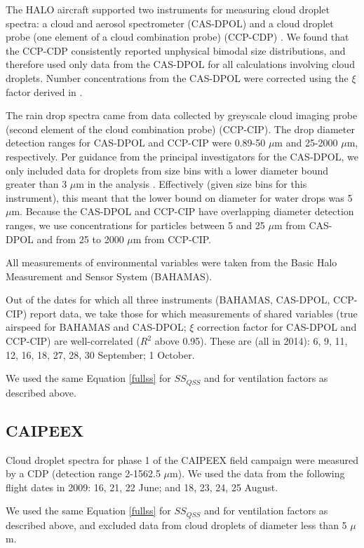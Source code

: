 \documentclass{article}
\begin{document}
The HALO aircraft supported two instruments for measuring cloud droplet spectra: a cloud and aerosol spectrometer (CAS-DPOL) and a cloud droplet probe (one element of a cloud combination probe) (CCP-CDP) \cite{Braga2017}. We found that the CCP-CDP consistently reported unphysical bimodal size distributions, and therefore used only data from the CAS-DPOL for all calculations involving cloud droplets. Number concentrations from the CAS-DPOL were corrected using the $\xi$ factor derived in \cite{Weigel2016}.

The rain drop spectra came from data collected by greyscale cloud imaging probe (second element of the cloud combination probe) (CCP-CIP). The drop diameter detection ranges for CAS-DPOL and CCP-CIP were 0.89-50 $\mu$m and 25-2000 $\mu$m, respectively. Per guidance from the principal investigators for the CAS-DPOL, we only included data for droplets from size bins with a lower diameter bound greater than 3 $\mu$m in the analysis \cite{Jurkat2020}. Effectively (given size bins for this instrument), this meant that the lower bound on diameter for water drops was 5 $\mu$m. Because the CAS-DPOL and CCP-CIP have overlapping diameter detection ranges, we use concentrations for particles between 5 and 25 $\mu$m from CAS-DPOL and from 25 to 2000 $\mu$m from CCP-CIP. 

All measurements of environmental variables were taken from the Basic Halo Measurement and Sensor System (BAHAMAS).

Out of the dates for which all three instruments (BAHAMAS, CAS-DPOL, CCP-CIP) report data, we take those for which measurements of shared variables (true airspeed for BAHAMAS and CAS-DPOL; $\xi$ correction factor for CAS-DPOL and CCP-CIP) are well-correlated ($R^2$ above 0.95). These are (all in 2014): 6, 9, 11, 12, 16, 18, 27, 28, 30 September; 1 October.

We used the same Equation \ref{fullss} for $SS_{QSS}$ and for ventilation factors as described above.

\subsection{CAIPEEX}

Cloud droplet spectra for phase 1 of the CAIPEEX field campaign were measured by a CDP (detection range 2-1562.5 $\mu$m). We used the data from the following flight dates in 2009: 16, 21, 22 June; and 18, 23, 24, 25 August.

We used the same Equation \ref{fullss} for $SS_{QSS}$ and for ventilation factors as described above, and excluded data from cloud droplets of diameter less than 5 $\mu$m.
\end{document}
